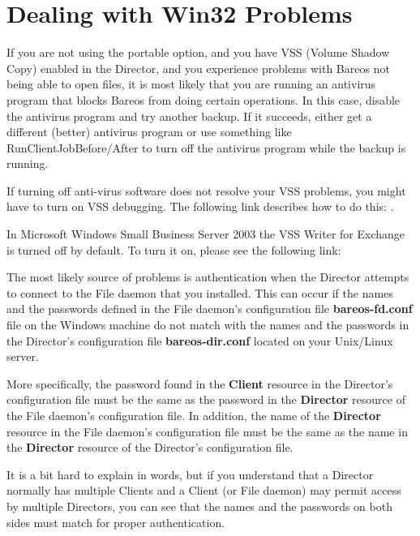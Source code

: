 \section{Dealing with Win32 Problems}
\label{problems}

If you are not using the portable option, and you have VSS
(Volume Shadow Copy) enabled in the Director, and you experience
problems with Bareos not being able to open files, it is most
likely that you are running an antivirus program that blocks
Bareos from doing certain operations. In this case, disable the
antivirus program and try another backup.  If it succeeds, either
get a different (better) antivirus program or use something like
RunClientJobBefore/After to turn off the antivirus program while
the backup is running.

If turning off anti-virus software does not resolve your VSS
problems, you might have to turn on VSS debugging.  The following
link describes how to do this:
.

In Microsoft Windows Small Business Server 2003 the VSS Writer for Exchange
is turned off by default. To turn it on, please see the following link:


The most likely source of problems is authentication when the Director
attempts to connect to the File daemon that you installed. This can occur if
the names and the passwords defined in the File daemon's configuration file
{\bf bareos-fd.conf} file on
the Windows machine do not match with the names and the passwords in the
Director's configuration file {\bf bareos-dir.conf} located on your Unix/Linux
server.

More specifically, the password found in the {\bf Client} resource in the
Director's configuration file must be the same as the password in the {\bf
Director} resource of the File daemon's configuration file. In addition, the
name of the {\bf Director} resource in the File daemon's configuration file
must be the same as the name in the {\bf Director} resource of the Director's
configuration file.

It is a bit hard to explain in words, but if you understand that a Director
normally has multiple Clients and a Client (or File daemon) may permit access
by multiple Directors, you can see that the names and the passwords on both
sides must match for proper authentication.

